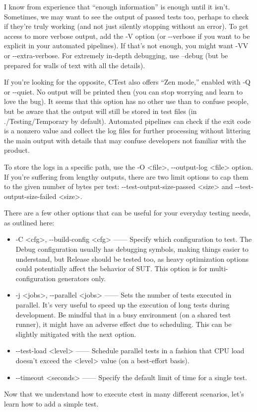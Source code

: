 I know from experience that “enough information” is enough until it isn’t. Sometimes, we may want to see the output of passed tests too, perhaps to check if they’re truly working (and not just silently stopping without an error). To get access to more verbose output, add the -V option (or -{}-verbose if you want to be explicit in your automated pipelines). If that’s not enough, you might want -VV or -{}-extra-verbose. For extremely in-depth debugging, use --debug (but be prepared for walls of text with all the details).

If you’re looking for the opposite, CTest also offers “Zen mode,” enabled with -Q or -{}-quiet. No output will be printed then (you can stop worrying and learn to love the bug). It seems that this option has no other use than to confuse people, but be aware that the output will still be stored in test files (in ./Testing/Temporary by default). Automated pipelines can check if the exit code is a nonzero value and collect the log files for further processing without littering the main output with details that may confuse developers not familiar with the product.

To store the logs in a specific path, use the -O <file>, -{}-output-log <file> option. If you’re suffering from lengthy outputs, there are two limit options to cap them to the given number of bytes per test: -{}-test-output-size-passed <size> and -{}-test-output-size-failed <size>.


There are a few other options that can be useful for your everyday testing needs, as outlined here:

\begin{itemize}
\item
-C <cfg>, -{}-build-config <cfg> —— Specify which configuration to test. The Debug configuration usually has debugging symbols, making things easier to understand, but Release should be tested too, as heavy optimization options could potentially affect the behavior of SUT. This option is for multi-configuration generators only.

\item
-j <jobs>, -{}-parallel <jobs> —— Sets the number of tests executed in parallel. It’s very useful to speed up the execution of long tests during development. Be mindful that in a busy environment (on a shared test runner), it might have an adverse effect due to scheduling. This can be slightly mitigated with the next option.

\item
-{}-test-load <level> —— Schedule parallel tests in a fashion that CPU load doesn’t exceed the <level> value (on a best-effort basis).

\item
-{}-timeout <seconds> —— Specify the default limit of time for a single test.
\end{itemize}

Now that we understand how to execute ctest in many different scenarios, let’s learn how to add a simple test.



